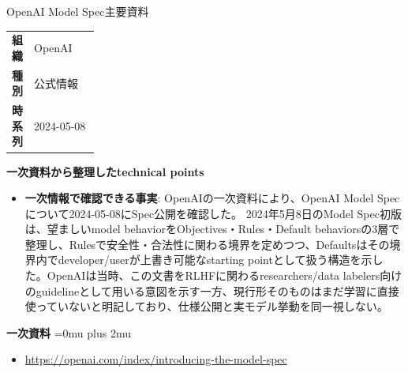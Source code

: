 \begin{technicalnote}{OpenAI Model Spec}{主要資料}
\begingroup
\begin{tabularx}{\linewidth}{@{}>{\bfseries}p{0.22\linewidth}X@{}}
組織 & OpenAI \\
種別 & 公式情報 \\
時系列 & 2024-05-08 \\
\end{tabularx}
\smallskip
\begin{minipage}{\linewidth}
{\bfseries 一次資料から整理したtechnical points}
\begin{itemize}[leftmargin=1.5em,itemsep=0.35em]
\item \textbf{一次情報で確認できる事実}: OpenAIの一次資料により、OpenAI Model Specについて2024-05-08にSpec公開を確認した。 2024年5月8日のModel Spec初版は、望ましいmodel behaviorをObjectives・Rules・Default behaviorsの3層で整理し、Rulesで安全性・合法性に関わる境界を定めつつ、Defaultsはその境界内でdeveloper/userが上書き可能なstarting pointとして扱う構造を示した。OpenAIは当時、この文書をRLHFに関わるresearchers/data labelers向けのguidelineとして用いる意図を示す一方、現行形そのものはまだ学習に直接使っていないと明記しており、仕様公開と実モデル挙動を同一視しない。
\end{itemize}
\begin{minipage}{\linewidth}
\begin{samepage}
{\bfseries 一次資料}
\begingroup\sloppy
\Urlmuskip=0mu plus 2mu\relax
\begin{itemize}[leftmargin=1.5em,itemsep=0.25em]
\item {\scriptsize\url{https://openai.com/index/introducing-the-model-spec}}
\end{itemize}
\endgroup
\end{samepage}
\end{minipage}
\end{minipage}
\endgroup
\end{technicalnote}
\medskip

